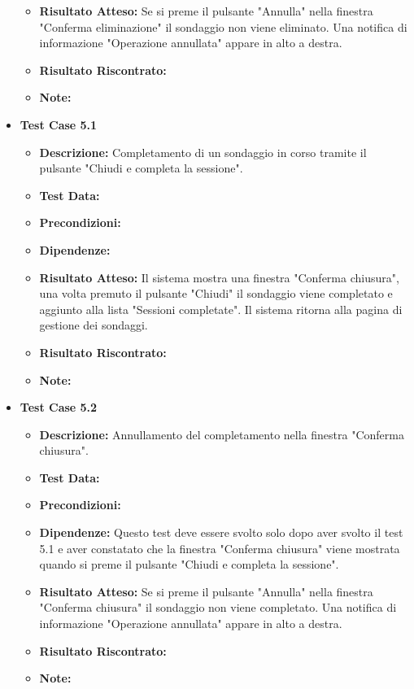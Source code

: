 \begin{itemize}
\begin{itemize}
                    \item \textbf{Risultato Atteso:} Se si preme il pulsante "Annulla" nella finestra "Conferma eliminazione" il sondaggio non viene eliminato. Una notifica di informazione "Operazione annullata" appare in alto a destra.
                    \item \textbf{Risultato Riscontrato:}
                    \item \textbf{Note:}
                \end{itemize}
            \item \textbf{Test Case 5.1}
                \begin{itemize}
                    \item \textbf{Descrizione:} Completamento di un sondaggio in corso tramite il pulsante "Chiudi e completa la sessione".
                    \item \textbf{Test Data:}
                    \item \textbf{Precondizioni:}
                    \item \textbf{Dipendenze:}
                    \item \textbf{Risultato Atteso:} Il sistema mostra una finestra "Conferma chiusura", una volta premuto il pulsante "Chiudi" il sondaggio viene completato e aggiunto alla lista "Sessioni completate". Il sistema ritorna alla pagina di gestione dei sondaggi.
                    \item \textbf{Risultato Riscontrato:}
                    \item \textbf{Note:}
                \end{itemize}                
            \item \textbf{Test Case 5.2}
                \begin{itemize}
                    \item \textbf{Descrizione:} Annullamento del completamento nella finestra "Conferma chiusura".
                    \item \textbf{Test Data:}
                    \item \textbf{Precondizioni:}
                    \item \textbf{Dipendenze:} Questo test deve essere svolto solo dopo aver svolto il test 5.1 e aver constatato che la finestra "Conferma chiusura" viene mostrata quando si preme il pulsante "Chiudi e completa la sessione".
                    \item \textbf{Risultato Atteso:} Se si preme il pulsante "Annulla" nella finestra "Conferma chiusura" il sondaggio non viene completato. Una notifica di informazione "Operazione annullata" appare in alto a destra.
                    \item \textbf{Risultato Riscontrato:}
                    \item \textbf{Note:}
                \end{itemize}
        \end{itemize}


